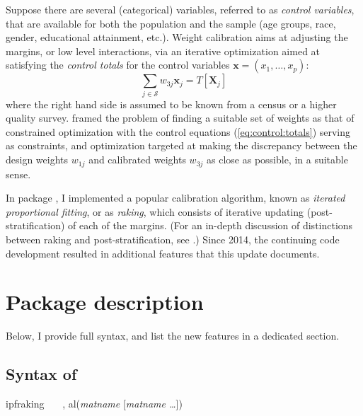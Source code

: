 Suppose there are several (categorical) variables, referred to
as {\it control variables}, that are available for both
the population and the sample
(age groups, race, gender, educational attainment, etc.).
Weight calibration aims at adjusting the margins, or low level interactions,
via an iterative optimization aimed at satisfying
the {\it control totals} for the control variables $\mathbf{x}=(x_1, \ldots, x_p)$:
\begin{equation}
    \sum_{j \in \mathcal{S}} w_{3j} \mathbf{x}_j
    = T [ \mathbf{X}_j  ]
    \label{eq:control:totals}
\end{equation}
where the right hand side is assumed to be known from a census or
a higher quality survey.
\citet{deville:sarndal:1992} framed the problem of finding a suitable
set of weights as that of constrained optimization with the control
equations (\ref{eq:control:totals}) serving as constraints,
and optimization targeted at making the discrepancy between
the design weights $w_{1j}$ and calibrated weights
$w_{3j}$ as close as possible, in a suitable sense. 

In package  \citep{kolenikov:2014}, I implemented
a popular calibration algorithm, known as \textit{iterated proportional fitting},
or as \textit{raking}, which consists of iterative updating (post-stratification) of
each of the margins. (For an in-depth discussion of distinctions between
raking and post-stratification, see \citet{kolenikov:2016}.) 
Since 2014, the continuing code development resulted 
in additional features that this update documents.

\section{Package description}

Below, I provide full syntax, and list the new features in a dedicated section.

\subsection{Syntax of }
\label{subsec:syntax}

\begin{stsyntax}
ipfraking
\optif\
\optin\
\optweight\
,
al({\it matname} [{\it matname \ldots}])
\end{stsyntax}


